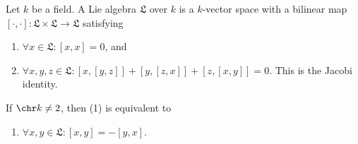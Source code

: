 Let $k$ be a field. A Lie algebra $\mathfrak{L}$ over $k$ is a $k$-vector space with
a bilinear map $[\cdot, \cdot]\colon \mathfrak{L}\times \mathfrak{L}\to \mathfrak{L}$ satisfying
\begin{enumerate}[label=(\arabic*)]
	\item $\forall x \in \mathfrak{L}\colon [x, x] = 0$, and
	\item $\forall x, y, z \in \mathfrak{L}\colon [x, [y, z]] + [y, [z, x]] + [z, [x, y]] = 0$.
		This is the Jacobi identity.
\end{enumerate}

If $\chr k \neq 2$, then (1) is equivalent to
\begin{enumerate}[label=(\arabic*')]
	\item $\forall x, y \in \mathfrak{L}\colon [x, y] = -[y, x]$.
\end{enumerate}
